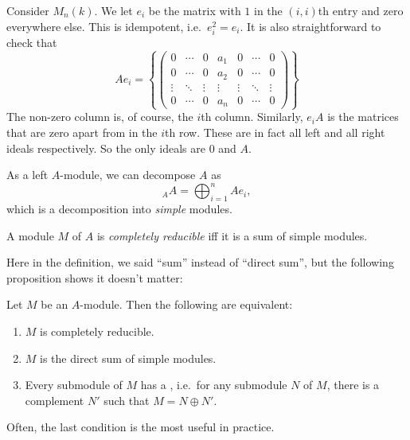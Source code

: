 \documentclass[a4paper]{article}
\begin{document}
\begin{eg}
  Consider $M_n(k)$. We let $e_i$ be the matrix with $1$ in the $(i, i)$th entry and zero everywhere else. This is idempotent, i.e.\ $e_i^2 = e_i$. It is also straightforward to check that
  \[
    A e_i =
    \left\{
      \begin{pmatrix}
        0 & \cdots & 0 & a_1 & 0 & \cdots & 0\\
        0 & \cdots & 0 & a_2 & 0 & \cdots & 0\\
        \vdots & \ddots & \vdots & \vdots & \vdots & \ddots & \vdots\\
        0 & \cdots & 0 & a_n & 0 & \cdots & 0
      \end{pmatrix}
    \right\}
  \]
  The non-zero column is, of course, the $i$th column. Similarly, $e_i A$ is the matrices that are zero apart from in the $i$th row. These are in fact all left and all right ideals respectively. So the only ideals are $0$ and $A$.

  As a left $A$-module, we can decompose $A$ as
  \[
    _A A = \bigoplus_{i = 1}^n A e_i,
  \]
  which is a decomposition into \emph{simple} modules.
\end{eg}

\begin{defi}
  A module $M$ of $A$ is \emph{completely reducible} iff it is a sum of simple modules.
\end{defi}
Here in the definition, we said ``sum'' instead of ``direct sum'', but the following proposition shows it doesn't matter:

\begin{prop}
  Let $M$ be an $A$-module. Then the following are equivalent:
  \begin{enumerate}
    \item $M$ is completely reducible.
    \item $M$ is the direct sum of simple modules.
    \item Every submodule of $M$ has a , i.e.\ for any submodule $N$ of $M$, there is a complement $N'$ such that $M = N \oplus N'$.
  \end{enumerate}
\end{prop}
Often, the last condition is the most useful in practice.
\end{document}
